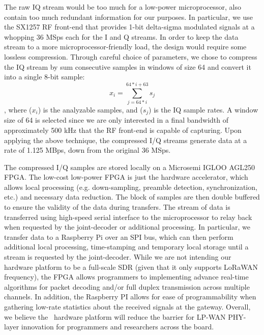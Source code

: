 
 The raw IQ stream would be too much for a low-power microprocessor, also contain too much redundant information for our purposes. In particular, we use the SX1257 RF front-end that provides 1-bit delta-sigma modulated signals at a whopping 36 MSps each for the I and Q streams.  In order to keep the data stream to a more microprocessor-friendly load, the design would require some lossless compression. Through careful choice of parameters, we chose to compress the IQ stream by sum consecutive samples in windows of size 64 and convert it into a single 8-bit sample: 
\begin{equation}
x_i = \sum_{j=64*i}^{64*i + 63} s_j
\end{equation}
, where ($x_i$) is the analyzable samples, and ($s_j$) is the IQ sample rates. A window size of 64 is selected since we are only interested in a final
bandwidth of approximately 500 kHz that the RF front-end is capable of
capturing. Upon applying the above technique, the compressed I/Q streams generate data at a rate of 1.125 MBps, down from the original 36 MSps. \vspace*{0.1in}


 The compressed I/Q samples are stored locally on a Microsemi IGLOO AGL250 FPGA. The low-cost low-power FPGA is just the hardware accelerator, which allows local processing (e.g. down-sampling, preamble detection, synchronization, etc.) and necessary data reduction.  The block of samples are then double buffered to ensure the validity of the data during transfers. The stream of data is transferred using high-speed serial interface to the microprocessor to relay back when requested by the joint-decoder or additional processing. In particular, we transfer data to a Raspberry Pi over an SPI bus, which can then perform additional local processing, time-stamping and temporary local storage until a stream is requested by the joint-decoder. While we are not intending our hardware platform to be a full-scale SDR (given that it only supports LoRaWAN frequency), the FPGA allows programmers to implementing advance real-time algorithms for packet decoding and/or full duplex transmission across multiple channels. In addition, the Raspberry PI allows for ease of programmability when gathering low-rate statistics about the received signals at the gateway. Overall, we believe the \name\ hardware platform will reduce the barrier for LP-WAN PHY-layer innovation for programmers and researchers across the board. 

